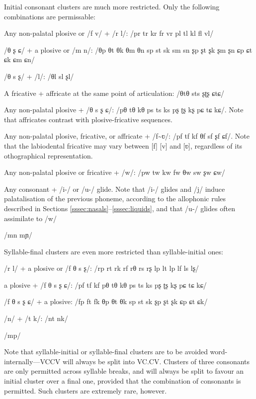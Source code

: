 \documentclass[grammar]{subfiles}
\begin{document}
	Initial consonant clusters are much more restricted. Only the following combinations are permissable:

	\begin{itemize*}
	\item Any non-palatal plosive or /f v/ + /r l/: /pr tr kr fr vr pl tl kl fl vl/ 
	\item /θ ʂ ɕ/ + a plosive or /m n/: /θp θt θk θm θn sp st sk sm sn ʂp ʂt ʂk ʂm ʂn ɕp ɕt ɕk ɕm ɕn/
	\item /θ s ʂ/ + /l/: /θl sl ʂl/
	\item A fricative + affricate at the same point of articulation: /θtθ sts ʂʈʂ ɕtɕ/
	\item Any non-palatal plosive + /θ s ʂ ɕ/: /pθ tθ kθ ps ts ks pʂ ʈʂ kʂ pɕ tɕ kɕ/. Note that affricates contrast with plosive-fricative sequences.
	\item Any non-palatal plosive, fricative, or affricate + /f\textasciitilde ʋ/: /pf tf kf θf sf ʂf ɕf/. Note that the labiodental fricative may vary between [f] [v] and [ʋ], regardless of its othographical representation.
	\item Any non-palatal plosive or fricative + /w/: /pw tw kw fw θw sw ʂw ɕw/
	\item Any consonant + /i-/ or /u-/ glide. Note that /i-/ glides and /j/ induce palatalisation of the previous phoneme, according to the allophonic rules described in Sections \ref{sssec:nasals}–\ref{sssec:liquids}, and that /u-/ glides often assimilate to /w/
	\item /mn mɲ/
	\end{itemize*}

	Syllable-final clusters are even more restricted than syllable-initial ones:

	\begin{itemize*}
	\item /r l/ + a plosive or /f θ s ʂ/: /rp rt rk rf rθ rs rʂ lp lt lp lf ls lʂ/
	\item a plosive + /f θ s ʂ ɕ/: /pf tf kf pθ tθ kθ ps ts ks pʂ ʈʂ kʂ pɕ tɕ kɕ/
	\item /f θ s ʂ ɕ/ + a plosive: /fp ft fk θp θt θk sp st sk ʂp ʂt ʂk ɕp ɕt ɕk/
	\item /n/ + /t k/: /nt nk/
	\item /mp/
	\end{itemize*}

	Note that syllable-initial or syllable-final clusters are to be avoided word-internally—VCCV will always be split into VC.CV\@. Clusters of three consonants are only permitted across syllable breaks, and will always be split to favour an initial cluster over a final one, provided that the combination of consonants is permitted. Such clusters are extremely rare, however.
\end{document}
